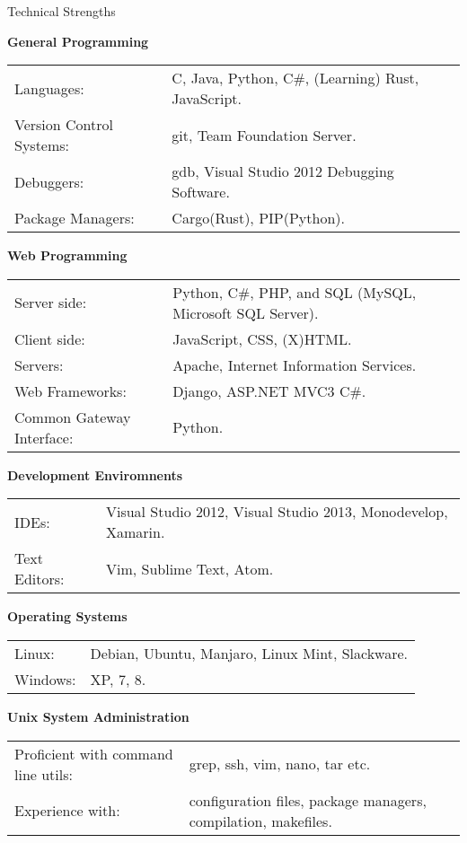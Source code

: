 \documentclass{resume} %
\newcommand{\btab}[2]{
	\bgroup
	\def\arraystretch{#1}
	\begin{tabular}{#2}
}
\newcommand{\etab}{
	\end{tabular} \smallskip
	\egroup
}
\begin{document}

\begin{rSection}{Technical Strengths}

{\bf General Programming}

\btab{1.1}{ l l }
	Languages: & C, Java, Python, C\#, (Learning) Rust, JavaScript. \\
	Version Control Systems: & git, Team Foundation Server. \\
	Debuggers: & gdb, Visual Studio 2012 Debugging Software. \\
	Package Managers: & Cargo(Rust), PIP(Python). \\
\etab

{\bf Web Programming}

\btab{1.1}{ l l }
	Server side: & Python, C\#, PHP, and SQL (MySQL, Microsoft SQL Server). \\
	Client side: & JavaScript, CSS, (X)HTML. \\
	Servers: & Apache, Internet Information Services. \\
	Web Frameworks: & Django, ASP.NET MVC3 C\#. \\
	Common Gateway Interface: & Python. \\
\etab

{\bf Development Enviromnents}

\btab{1.1}{ l l }
    IDEs: & Visual Studio 2012, Visual Studio 2013, Monodevelop, Xamarin. \\
	Text Editors: & Vim, Sublime Text, Atom. \\
\etab

{\bf Operating Systems}

\btab{1.1}{ l l }
	Linux: & Debian, Ubuntu, Manjaro, Linux Mint, Slackware. \\
	Windows: & XP, 7, 8. \\
\etab

{\bf Unix System Administration}

\btab{1.1}{ l l }
	Proficient with command line utils: & grep, ssh, vim, nano, tar etc. \\
	Experience with: & configuration files, package managers, compilation, makefiles. \\
\etab

\end{rSection}
\end{document}
